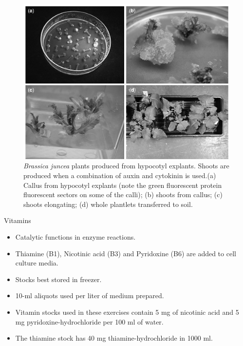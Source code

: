 \documentclass[
  ignorenonframetext,
  aspectratio=169]{beamer}
\providecommand{\tightlist}{%
  \setlength{\itemsep}{0pt}\setlength{\parskip}{0pt}}
\begin{document}
\begin{frame}{}
\protect\hypertarget{section-7}{}
\begin{figure}
\includegraphics[width=0.45\linewidth]{../images/stages_of_tc} \caption{\textit{Brassica juncea} plants produced from hypocotyl explants. Shoots are produced when a combination of auxin and cytokinin is used.\newline (a) Callus from hypocotyl explants (note the green fluorescent protein fluorescent sectors on some of the calli); (b) shoots from callus; (c) shoots elongating; (d) whole plantlets transferred to soil.}\label{fig:stages-of-tc}
\end{figure}
\end{frame}

\begin{frame}{Vitamins}
\protect\hypertarget{vitamins}{}
\begin{itemize}
\tightlist
\item
  Catalytic functions in enzyme reactions.
\item
  Thiamine (B1), Nicotinic acid (B3) and Pyridoxine (B6) are added to
  cell culture media.
\item
  Stocks best stored in freezer.
\item
  10-ml aliquots used per liter of medium prepared.
\item
  Vitamin stocks used in these exercises contain 5 mg of nicotinic acid
  and 5 mg pyridoxine-hydrochloride per 100 ml of water.
\item
  The thiamine stock has 40 mg thiamine-hydrochloride in 1000 ml.
\end{itemize}
\end{frame}
\end{document}
